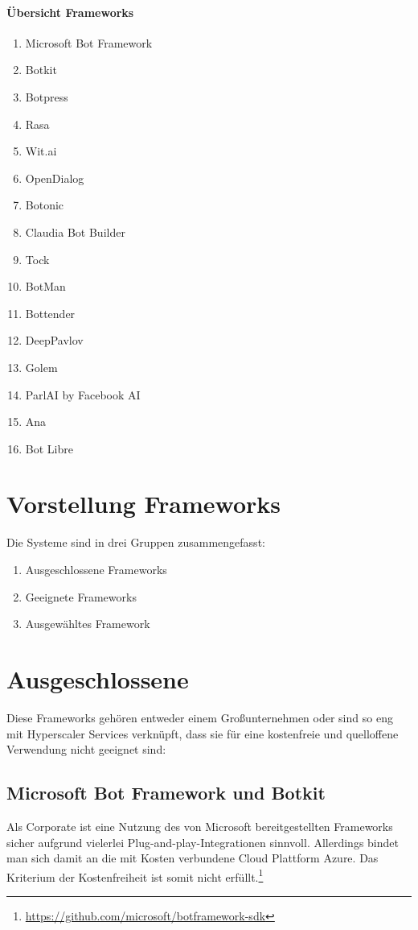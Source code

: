    \paragraph{Übersicht Frameworks}
    \begin{enumerate}
        \item Microsoft Bot Framework
        \item Botkit
        \item Botpress
        \item Rasa
        \item Wit.ai
        \item OpenDialog
        \item Botonic
        \item Claudia Bot Builder
        \item Tock
        \item BotMan
        \item Bottender
        \item DeepPavlov
        \item Golem
        \item ParlAI by Facebook AI
        \item Ana
        \item Bot Libre
    \end{enumerate}

    \section{Vorstellung Frameworks}
    Die Systeme sind in drei Gruppen zusammengefasst:
    \begin{enumerate}
        \item Ausgeschlossene Frameworks
        \item Geeignete Frameworks
        \item Ausgewähltes Framework
    \end{enumerate}

    \section{Ausgeschlossene}
    Diese Frameworks gehören entweder einem Großunternehmen oder sind so eng mit Hyperscaler Services verknüpft, dass sie für eine kostenfreie und quelloffene Verwendung nicht geeignet sind:

        \subsection{Microsoft Bot Framework und Botkit} 
            Als Corporate ist eine Nutzung des von Microsoft bereitgestellten Frameworks sicher aufgrund vielerlei Plug-and-play-Integrationen sinnvoll. Allerdings bindet man sich damit an die mit Kosten verbundene Cloud Plattform Azure. Das Kriterium der Kostenfreiheit ist somit nicht erfüllt.\footnote{\url{https://github.com/microsoft/botframework-sdk}}

